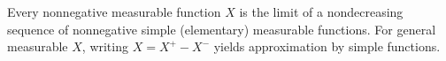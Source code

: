 Every nonnegative measurable function $X$ is the limit of a nondecreasing sequence of nonnegative simple (elementary) measurable functions. For general measurable $X$, writing $X = X^+ - X^-$ yields approximation by simple functions.
